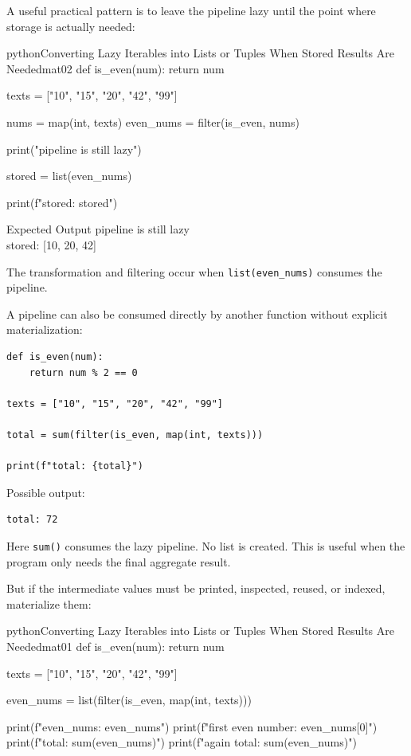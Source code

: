 A useful practical pattern is to leave the pipeline lazy until the point where storage is actually needed:

\begin{codebox}[]{python}{Converting Lazy Iterables into Lists or Tuples When Stored Results Are Needed}{mat02}
def is_even(num):
    return num %

texts = ["10", "15", "20", "42", "99"]

nums = map(int, texts)
even_nums = filter(is_even, nums)

print("pipeline is still lazy")

stored = list(even_nums)

print(f"stored: {stored}")
\end{codebox}


\begin{iobox}{Expected Output}
pipeline is still lazy \\
stored: [10, 20, 42] \\
\end{iobox}




The transformation and filtering occur when \texttt{list(even\_nums)} consumes the pipeline.

A pipeline can also be consumed directly by another function without explicit materialization:

\begin{verbatim}
def is_even(num):
    return num % 2 == 0

texts = ["10", "15", "20", "42", "99"]

total = sum(filter(is_even, map(int, texts)))

print(f"total: {total}")
\end{verbatim}

Possible output:

\begin{verbatim}
total: 72
\end{verbatim}

Here \texttt{sum()} consumes the lazy pipeline. No list is created. This is useful when the program only needs the final aggregate result.

But if the intermediate values must be printed, inspected, reused, or indexed, materialize them:

\begin{codebox}[]{python}{Converting Lazy Iterables into Lists or Tuples When Stored Results Are Needed}{mat01}
def is_even(num):
    return num %

texts = ["10", "15", "20", "42", "99"]

even_nums = list(filter(is_even, map(int, texts)))

print(f"even_nums: {even_nums}")
print(f"first even number: {even_nums[0]}")
print(f"total: {sum(even_nums)}")
print(f"again total: {sum(even_nums)}")
\end{codebox}


